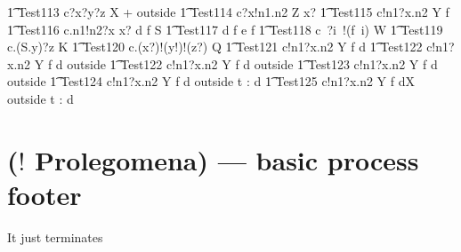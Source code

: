 \documentclass{article}
\begin{document}
%
\begin{circusaction}
   \t1 Test113 \circdef c?x?y?z \circat X \then {} + outside \rcirctime \Skip
   \also
   \t1 Test114 \circdef c?x!n1.n2 \circat Z \then \lcirctime x? \rcirctime \Skip 
   \also
   \t1 Test115 \circdef c!n1?x.n2 \circat Y \then \lcirctime f \rcirctime \Skip
   \also
   \t1 Test116 \circdef c.n1!n2?x \circat x? \then {} \rcirctime d \circat f \then \lcirctime \theta S \rcirctime \Skip 
   \also
   \t1 Test117 \circdef d \then \lcirctime f \rcirctime e \then \lcirctime f \rcirctime \Skip 
   \also
   \t1 Test118 \circdef c~?i~!(f~i) \circat W \then \Skip
       \also
   \t1 Test119 \circdef c.(S.y)?z \circat K \then \Skip
       \also
   \t1 Test120 \circdef c.(x?)!(y!)!(z?) \circat Q \then {} \rcirctime \Skip 
   \also
   \t1 Test121 \circdef c!n1?x.n2 \circat Y \then \lcirctime f \rcirctime d \then \Skip
   \also
   \t1 Test122 \circdef c!n1?x.n2 \circat Y \then \lcirctime f \rcirctime d \then \lcirctime 
   outside \rcirctime \Skip
   \also
   \t1 Test122 \circdef c!n1?x.n2 \circat Y \then \lcirctime f \rcirctime d \then \lcirctime 
   outside \rcirctime {} \rcirctime \circstartby \Skip  
   \also
   \t1 Test123 \circdef c!n1?x.n2 \circat Y \then \lcirctime f \rcirctime d \then \lcirctime 
   outside \rcirctime {} \rcirctime \circstartby {}
   \also
   \t1 Test124 \circdef c!n1?x.n2 \circat Y \then \lcirctime f \rcirctime d \then \lcirctime 
   outside \rcirctime {} \rcirctime \circstartby \circwait t : \nat \circspot d \then 
   \Skip   
   \also
   \t1 Test125 \circdef c!n1?x.n2 \circat Y \then \lcirctime f \rcirctime d\circat X \then 
   \lcirctime outside \rcirctime {} \rcirctime \circstartby \circwait t : \nat 
   \circspot d \then \Skip

\end{circusaction}    

\newpage
\section{($!$ Prolegomena) --- basic process footer}

It just terminates

\begin{circusaction}
   \circspot \Skip
\end{circusaction}

\begin{circus}
   \circend
\end{circus}
\end{document}
